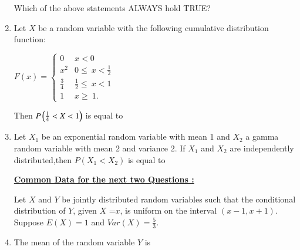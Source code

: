 \documentclass[journal,12pt,twocolumn]{IEEEtran}
\begin{document}
\begin{enumerate}
Which of the above statements ALWAYS hold TRUE?
\begin{enumerate}
\end{enumerate}

 
\item Let $X$ be a random variable with the following cumulative distribution function: 

\begin{center}
$ 
F(x)=
\begin{cases}
0 & x<0 \\
x^2 & 0\leq\ x <\frac{1}{2}\\
\frac{3}{4} & \frac{1}{2}\leq\ x<1\\
1 & x\geq\ 1.
\end{cases}
$\\ 

\end{center}
Then $P\left(\frac{1}{4}<X<1\right)$ is equal to \underline{\hspace{3cm}}
\\
\solution

 


\item Let $X_1$ be an exponential random variable with mean 1 and $X_2$ a gamma random variable with mean 2 and variance 2. If $X_1$ and $X_2$ are independently distributed,then $P(X_1<X_2)$ is equal to \underline{\hspace{3cm}}
\\
\solution

\begin{center}
\centering\underline{\textbf{Common Data for the next two Questions :}}
\end{center}


Let $X$ and $Y$ be jointly distributed random variables such that the conditional distribution of $Y$, given $X$ =$x$, is uniform on the interval $(x-1,x+1)$. Suppose $E(X)=1$ and $Var(X)=\frac{5}{3}$.
\\
\item The mean of the random variable $Y$ is 
\\
\begin{enumerate}
\begin{multicols}{2}
\setlength\itemsep{2em}


\end{multicols}
\end{enumerate}
\end{enumerate}
\end{document}
